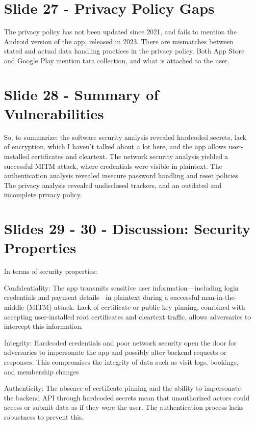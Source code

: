 \documentclass[12pt,a4paper]{article}
\begin{document}
\section*{Slide 27 - Privacy Policy Gaps}
The privacy policy has not been updated since 2021, and fails to mention the Android version of the app, released in 2023. There are mismatches between stated and actual data handling practices in the privacy policy. Both App Store and Google Play mention tata collection, and what is attached to the user.


\section*{Slide 28 - Summary of Vulnerabilities}
So, to summarize: the software security analysis revealed hardcoded secrets, lack of encryption, which I haven't talked about a lot here, and the app allows user-installed certificates and cleartext. The network security analysis yielded a successful MITM attack, where credentials were visible in plaintext. The authentication analysis revealed insecure password handling and reset policies. The privacy analysis revealed undisclosed trackers, and an outdated and incomplete privacy policy.


\section*{Slides 29 - 30 - Discussion: Security Properties}
In terms of security properties:

Confidentiality: The app transmits sensitive user information—including login credentials and payment details—in plaintext during a successful man-in-the-middle (MITM) attack. Lack of certificate or public key pinning, combined with accepting user-installed root certificates and cleartext traffic, allows adversaries to intercept this information.

Integrity: Hardcoded credentials and poor network security open the door for adversaries to impersonate the app and possibly alter backend requests or responses. This compromises the integrity of data such as visit logs, bookings, and membership changes

Authenticity: The absence of certificate pinning and the ability to impersonate the backend API through hardcoded secrets mean that unauthorized actors could access or submit data as if they were the user. The authentication process lacks robustness to prevent this.
\end{document}
